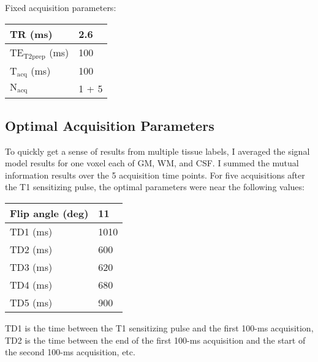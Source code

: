 \documentclass{article}         %
\theoremstyle{definition}
\theoremstyle{remark}
\begin{document}
Fixed acquisition parameters:

\begin{tabular}{|l|l|}
	\hline
	TR (ms) & 2.6 \\\hline
	$\mathrm{TE}_\mathrm{T2prep}$ (ms) & 100 \\\hline
	$\mathrm{T}_\mathrm{acq}$ (ms) & 100 \\\hline
	$\mathrm{N}_\mathrm{acq}$ & 1 + 5 \\\hline
\end{tabular}

\subsection{Optimal Acquisition Parameters}

To quickly get a sense of results from multiple tissue labels, I averaged the signal model results for one voxel each of GM, WM, and CSF. I summed the mutual information results over the 5 acquisition time points. For five acquisitions after the T1 sensitizing pulse, the optimal parameters were near the following values:

\begin{tabular}{|l|l|}
	\hline
	Flip angle (deg) & 11 \\\hline
	TD1 (ms) & 1010 \\\hline
	TD2 (ms) & 600 \\\hline
	TD3 (ms) & 620 \\\hline
	TD4 (ms) & 680 \\\hline
	TD5 (ms) & 900 \\\hline
\end{tabular}

TD1 is the time between the T1 sensitizing pulse and the first 100-ms acquisition, TD2 is the time between the end of the first 100-ms acquisition and the start of the second 100-ms acquisition, etc.
\end{document}
